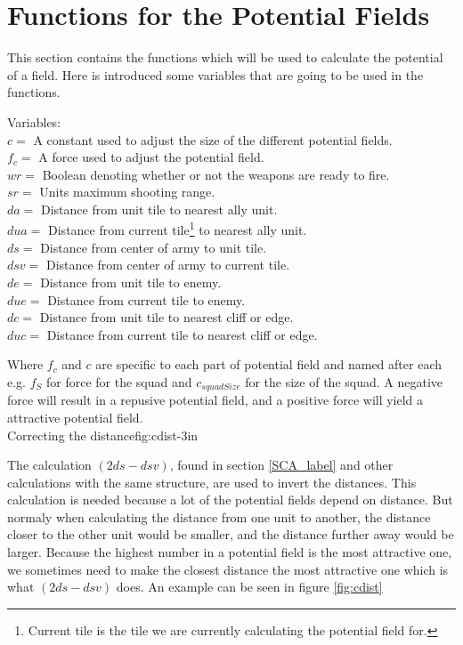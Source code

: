 \section{Functions for the Potential Fields}
	This section contains the functions which will be used to calculate the potential of a field. Here is introduced some variables that 
	are going to be used in the functions.
	
	\label{cha3_variables}
	Variables:\\
	$c =$ A constant used to adjust the size of the different potential fields.\\ 
	$f_c =$ A force used to adjust the potential field.\\
	$wr =$ Boolean denoting whether or not the weapons are ready to fire.\\
	$sr =$ Units maximum shooting range.\\
	$da =$ Distance from unit tile to nearest ally unit.\\
	$dua =$ Distance from current tile\footnote{Current tile is the tile we are currently calculating the potential field for.} to nearest ally unit.\\
	$ds =$ Distance from center of army to unit tile.\\
	$dsv =$ Distance from center of army to current tile.\\
	$de =$ Distance from unit tile to enemy.\\
	$due =$ Distance from current tile to enemy.\\
	$dc =$ Distance from unit tile to nearest cliff or edge. \\
	$duc =$ Distance from current tile to nearest cliff or edge. 
	
	
	
	Where $f_c$ and $c$ are specific to each part of potential field and named after each e.g. $f_{S}$ for force for the squad and $c_{squadSize}$ for the size of the squad. A negative force will result in a repusive potential field, and a positive force will yield a attractive potential field.\\
	
		    {Correcting the distance}{fig:cdist}{-3in}
			
	The calculation $(2ds - dsv)$, found in section \ref{SCA_label} and other calculations with the same structure, are used to invert the distances. This calculation is needed because a lot of the potential fields depend on distance. But normaly when calculating the distance from one unit to another, the distance closer to the other unit would be smaller, and the distance further away would be larger. Because the highest number in a potential field is the most attractive one, we sometimes need to make the closest distance the most attractive one which is what $(2ds - dsv)$ does. An example can be seen in figure \ref{fig:cdist}
	\pagebreak
